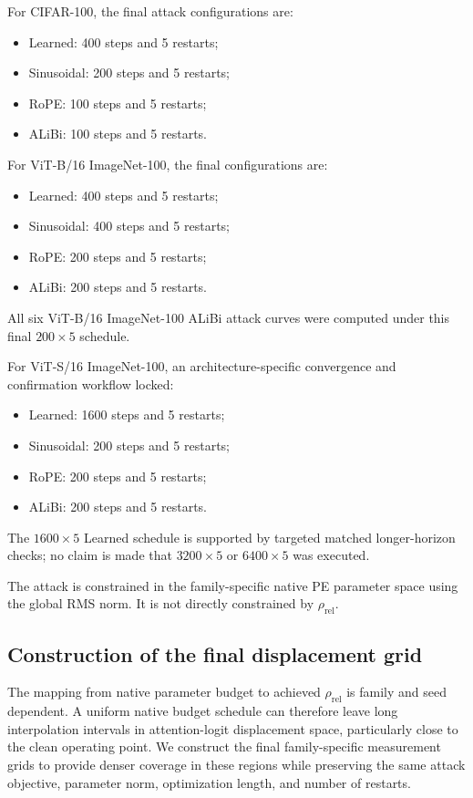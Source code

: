 \documentclass[preprint,12pt,authoryear]{elsarticle}
\begin{document}
For CIFAR-100, the final attack configurations are:
\begin{itemize}
    \item Learned: 400 steps and 5 restarts;
    \item Sinusoidal: 200 steps and 5 restarts;
    \item RoPE: 100 steps and 5 restarts;
    \item ALiBi: 100 steps and 5 restarts.
\end{itemize}

For ViT-B/16 ImageNet-100, the final configurations are:
\begin{itemize}
    \item Learned: 400 steps and 5 restarts;
    \item Sinusoidal: 400 steps and 5 restarts;
    \item RoPE: 200 steps and 5 restarts;
    \item ALiBi: 200 steps and 5 restarts.
\end{itemize}
All six ViT-B/16 ImageNet-100 ALiBi attack curves were computed under
this final $200\times5$ schedule.

For ViT-S/16 ImageNet-100, an architecture-specific convergence and
confirmation workflow locked:
\begin{itemize}
    \item Learned: 1600 steps and 5 restarts;
    \item Sinusoidal: 200 steps and 5 restarts;
    \item RoPE: 200 steps and 5 restarts;
    \item ALiBi: 200 steps and 5 restarts.
\end{itemize}
The $1600\times5$ Learned schedule is supported by targeted matched
longer-horizon checks; no claim is made that $3200\times5$ or
$6400\times5$ was executed.

The attack is constrained in the family-specific native PE parameter
space using the global RMS norm. It is not directly constrained by
$\rho_{\mathrm{rel}}$.


\subsection{Construction of the final displacement grid}

The mapping from native parameter budget to achieved
$\rho_{\mathrm{rel}}$ is family and seed dependent. A uniform native
budget schedule can therefore leave long interpolation intervals in
attention-logit displacement space, particularly close to the clean operating point. We
construct the final family-specific measurement grids to provide denser
coverage in these regions while preserving the same attack objective,
parameter norm, optimization length, and number of restarts.
\end{document}
